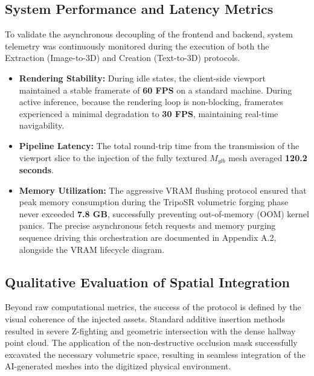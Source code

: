 \subsection{System Performance and Latency Metrics}
To validate the asynchronous decoupling of the frontend and backend, system telemetry was continuously monitored during the execution of both the Extraction (Image-to-3D) and Creation (Text-to-3D) protocols. 

\begin{itemize}
    \item \textbf{Rendering Stability:} During idle states, the client-side viewport maintained a stable framerate of \textbf{60 FPS} on a standard machine. During active inference, because the rendering loop is non-blocking, framerates experienced a minimal degradation to \textbf{30 FPS}, maintaining real-time navigability. 
    \item \textbf{Pipeline Latency:} The total round-trip time from the transmission of the viewport slice to the injection of the fully textured $M_{glb}$ mesh averaged \textbf{120.2 seconds}.
    \item \textbf{Memory Utilization:} The aggressive VRAM flushing protocol ensured that peak memory consumption during the TripoSR volumetric forging phase never exceeded \textbf{7.8 GB}, successfully preventing out-of-memory (OOM) kernel panics. The precise asynchronous fetch requests and memory purging sequence driving this orchestration are documented in Appendix A.2, alongside the VRAM lifecycle diagram.
\end{itemize}

\subsection{Qualitative Evaluation of Spatial Integration}
Beyond raw computational metrics, the success of the protocol is defined by the visual coherence of the injected assets. Standard additive insertion methods resulted in severe Z-fighting and geometric intersection with the dense hallway point cloud. The application of the non-destructive occlusion mask successfully excavated the necessary volumetric space, resulting in seamless integration of the AI-generated meshes into the digitized physical environment.